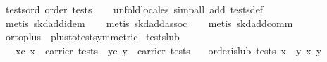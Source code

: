 \begin{isabellebody}
\isanewline
\isanewline
{}\isamarkupfalse%
\ tests{}ord{}\ {}order\ tests{}\isanewline
%
\isadelimproof
\ \ %
\endisadelimproof
%
\isatagproof
{}\isamarkupfalse%
\ {}unfold{}locales{}\ simp{}all\ add{}\ tests{}def{}\isanewline
\ \ \isamarkupfalse%
\ {}metis\ skd{}add{}idem{}\isanewline
\ \ \isamarkupfalse%
\ {}metis\ skd{}add{}assoc{}\isanewline
\ \ \isamarkupfalse%
\ {}metis\ skd{}add{}comm{}%
\endisatagproof
{\isafoldproof}%
%
\isadelimproof
\isanewline
%
\endisadelimproof
\isanewline
{}\isamarkupfalse%
\ or{}to{}plus\ {}\ plus{}to{}test{}symmetric{}\isanewline
\isanewline
{}\isamarkupfalse%
\ tests{}lub{}\isanewline
\ \ \ xc{}\ {}x\ {}\ carrier\ tests{}\ \ yc{}\ {}y\ {}\ carrier\ tests{}\isanewline
\ \ \ {}order{}is{}lub\ tests\ {}x\ {}\ y{}\ {}x{}\ y{}{}\isanewline

\end{isabellebody}
